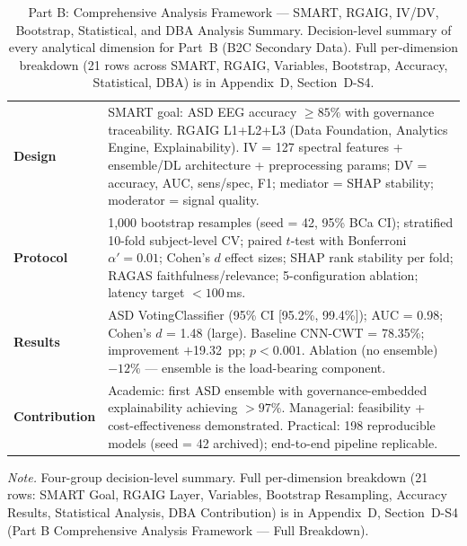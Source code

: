{\tablestripes\tablefontsize
{}
\begin{xltabular}{\textwidth}{@{} >{\raggedright\arraybackslash}p{2.5cm} L @{}}
\caption[Part B: Comprehensive Analysis Framework --- SMART,]{Part B: Comprehensive Analysis Framework --- SMART, RGAIG, IV/DV, Bootstrap, Statistical, and DBA Analysis Summary. Decision-level summary of every analytical dimension for Part~B (B2C Secondary Data). Full per-dimension breakdown (21 rows across SMART, RGAIG, Variables, Bootstrap, Accuracy, Statistical, DBA) is in Appendix~D, Section~D-S4.}\label{tab:ch4_partb_comprehensive} \\
\toprule
{} &  \\
\midrule
\endfirsthead
\endhead
\bottomrule
\endlastfoot
\textbf{Design} & SMART goal: ASD EEG accuracy $\geq 85\%$ with governance traceability. RGAIG L1+L2+L3 (Data Foundation, Analytics Engine, Explainability). IV = 127 spectral features + ensemble/DL architecture + preprocessing params; DV = accuracy, AUC, sens/spec, F1; mediator = SHAP stability; moderator = signal quality. \\
\addlinespace
\textbf{Protocol} & 1,000 bootstrap resamples (seed = 42, 95\% BCa CI); stratified 10-fold subject-level CV; paired $t$-test with Bonferroni $\alpha' = 0.01$; Cohen's $d$ effect sizes; SHAP rank stability per fold; RAGAS faithfulness/relevance; 5-configuration ablation; latency target $< 100$\,ms. \\
\addlinespace
\textbf{Results} & ASD VotingClassifier \textbf{\asdacc{}} (95\% CI [95.2\%, 99.4\%]); AUC = 0.98; Cohen's $d$ = 1.48 (large). Baseline CNN-CWT = 78.35\%; improvement $+$19.32~pp; $p < 0.001$. Ablation (no ensemble) $-12\%$ --- ensemble is the load-bearing component. \\
\addlinespace
\textbf{Contribution} & Academic: first ASD ensemble with governance-embedded explainability achieving $> 97\%$. Managerial: feasibility + cost-effectiveness demonstrated. Practical: 198 reproducible models (seed = 42 archived); end-to-end pipeline replicable. \\
\end{xltabular}}
\vspace{0.4em}
\noindent\textit{Note.} Four-group decision-level summary. Full per-dimension breakdown (21 rows: SMART Goal, RGAIG Layer, Variables, Bootstrap Resampling, Accuracy Results, Statistical Analysis, DBA Contribution) is in Appendix~D, Section~D-S4 (Part B Comprehensive Analysis Framework --- Full Breakdown).


